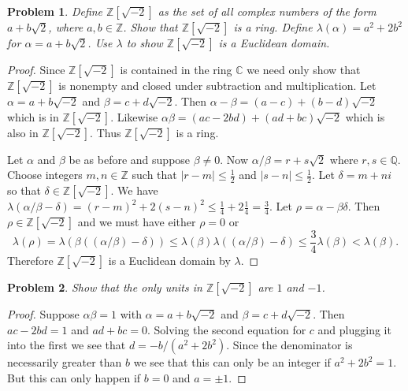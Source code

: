 \documentclass{article}
\newtheorem{problem}{Problem}
\begin{document}
\begin{problem}
Define $\mathbb{Z}[\sqrt{-2}]$ as the set of all complex numbers of the form $a + b\sqrt{2}$, where $a,b \in \mathbb{Z}$. Show that $\mathbb{Z}[\sqrt{-2}]$ is a ring. Define $\lambda(\alpha) = a^2 + 2b^2$ for $\alpha = a + b \sqrt{2}$. Use $\lambda$ to show $\mathbb{Z}[\sqrt{-2}]$ is a Euclidean domain.
\end{problem}
\begin{proof}
Since $\mathbb{Z}[\sqrt{-2}]$ is contained in the ring $\mathbb{C}$ we need only show that $\mathbb{Z}[\sqrt{-2}]$ is nonempty and closed under subtraction and multiplication. Let $\alpha = a + b \sqrt{-2}$ and $\beta = c + d \sqrt{-2}$. Then $\alpha - \beta = (a-c) + (b-d) \sqrt{-2}$ which is in $\mathbb{Z}[\sqrt{-2}]$. Likewise $\alpha \beta = (ac - 2bd) + (ad + bc)\sqrt{-2}$ which is also in $\mathbb{Z}[\sqrt{-2}]$. Thus $\mathbb{Z}[\sqrt{-2}]$ is a ring.

Let $\alpha$ and $\beta$ be as before and suppose $\beta \neq 0$. Now $\alpha/\beta = r + s\sqrt{2}$ where $r,s \in \mathbb{Q}$. Choose integers $m,n \in \mathbb{Z}$ such that $|r-m| \leq \frac{1}{2}$ and $|s-n| \leq \frac{1}{2}$. Let $\delta = m + ni$ so that $\delta \in \mathbb{Z}[\sqrt{-2}]$. We have $\lambda (\alpha/\beta - \delta) = (r-m)^2 + 2(s-n)^2 \leq \frac{1}{4} + 2\frac{1}{4} = \frac{3}{4}$. Let $\rho = \alpha - \beta \delta$. Then $\rho \in \mathbb{Z}[\sqrt{-2}]$ and we must have either $\rho = 0$ or
\[
\lambda (\rho) = \lambda(\beta((\alpha/\beta) - \delta)) \leq \lambda(\beta) \lambda((\alpha/\beta) - \delta) \leq \frac{3}{4} \lambda (\beta) < \lambda (\beta).
\]
Therefore $\mathbb{Z}[\sqrt{-2}]$ is a Euclidean domain by $\lambda$.
\end{proof}

\begin{problem}
\label{root2}
Show that the only units in $\mathbb{Z}[\sqrt{-2}]$ are $1$ and $-1$.
\end{problem}
\begin{proof}
Suppose $\alpha \beta = 1$ with $\alpha = a + b \sqrt{-2}$ and $\beta = c + d \sqrt{-2}$. Then $ac - 2bd = 1$ and $ad + bc = 0$. Solving the second equation for $c$ and plugging it into the first we see that $d = -b/(a^2 + 2b^2)$. Since the denominator is necessarily greater than $b$ we see that this can only be an integer if $a^2 + 2b^2 = 1$. But this can only happen if $b = 0$ and $a = \pm 1$.
\end{proof}
\end{document}
